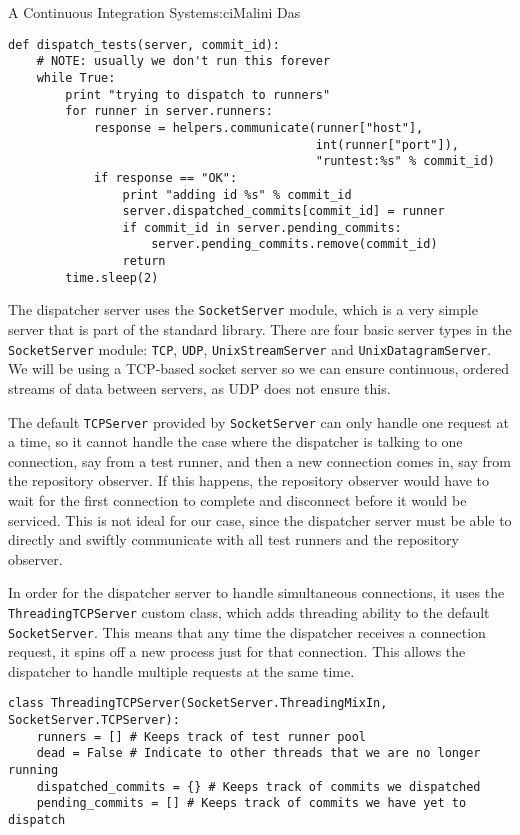 \begin{aosachapter}{A Continuous Integration System}{s:ci}{Malini Das}
\begin{verbatim}
def dispatch_tests(server, commit_id):
    # NOTE: usually we don't run this forever
    while True:
        print "trying to dispatch to runners"
        for runner in server.runners:
            response = helpers.communicate(runner["host"],
                                           int(runner["port"]),
                                           "runtest:%s" % commit_id)
            if response == "OK":
                print "adding id %s" % commit_id
                server.dispatched_commits[commit_id] = runner
                if commit_id in server.pending_commits:
                    server.pending_commits.remove(commit_id)
                return
        time.sleep(2)
\end{verbatim}

The dispatcher server uses the \texttt{SocketServer} module, which is a
very simple server that is part of the standard library. There are four
basic server types in the \texttt{SocketServer} module: \texttt{TCP},
\texttt{UDP}, \texttt{UnixStreamServer} and \texttt{UnixDatagramServer}.
We will be using a TCP-based socket server so we can ensure continuous,
ordered streams of data between servers, as UDP does not ensure this.

The default \texttt{TCPServer} provided by \texttt{SocketServer} can
only handle one request at a time, so it cannot handle the case where
the dispatcher is talking to one connection, say from a test runner, and
then a new connection comes in, say from the repository observer. If
this happens, the repository observer would have to wait for the first
connection to complete and disconnect before it would be serviced. This
is not ideal for our case, since the dispatcher server must be able to
directly and swiftly communicate with all test runners and the
repository observer.

In order for the dispatcher server to handle simultaneous connections,
it uses the \newline \texttt{ThreadingTCPServer} custom class, which
adds threading ability to the default \texttt{SocketServer}. This means
that any time the dispatcher receives a connection request, it spins off
a new process just for that connection. This allows the dispatcher to
handle multiple requests at the same time.

\begin{verbatim}
class ThreadingTCPServer(SocketServer.ThreadingMixIn, SocketServer.TCPServer):
    runners = [] # Keeps track of test runner pool
    dead = False # Indicate to other threads that we are no longer running
    dispatched_commits = {} # Keeps track of commits we dispatched
    pending_commits = [] # Keeps track of commits we have yet to dispatch
\end{verbatim}


\end{aosachapter}
